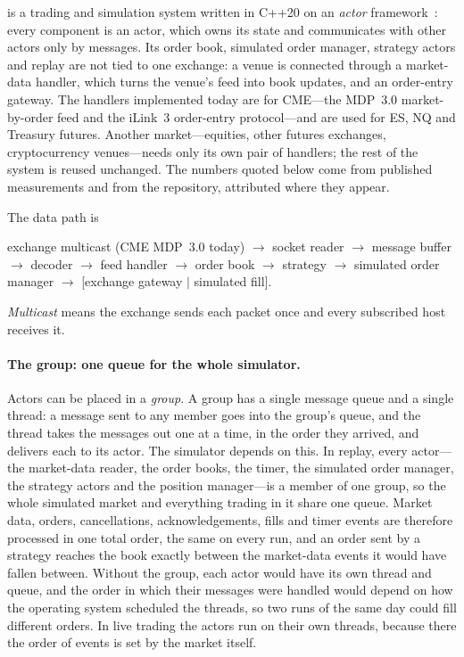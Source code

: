 \kasparhft{} is a trading and simulation system written in C++20 on an \emph{actor} framework~\citep{maciejewski_actor}:
every component is an actor, which owns its state and communicates with other actors only by messages. Its order
book, simulated order manager, strategy actors and replay are not tied to one exchange: a venue is connected through
a market-data handler, which turns the venue's feed into book updates, and an order-entry gateway. The handlers
implemented today are for CME---the MDP~3.0 market-by-order feed and the iLink~3 order-entry protocol---and are used
for ES, NQ and Treasury futures. Another market---equities, other futures exchanges, cryptocurrency venues---needs
only its own pair of handlers; the rest of the system is reused unchanged. The numbers quoted below come from
published measurements and from the \kasparhft{} repository, attributed where they appear.

The data path is
\begin{center}\small
exchange multicast (CME MDP~3.0 today) $\to$ socket reader $\to$ message buffer $\to$ decoder $\to$ feed handler
$\to$ order book $\to$ strategy $\to$ simulated order manager $\to$ [exchange gateway $\mid$ simulated fill].
\end{center}
\emph{Multicast} means the exchange sends each packet once and every subscribed host receives it. 

\paragraph{The group: one queue for the whole simulator.}\label{sec:kaspar-group} Actors can be placed in a \emph{group}. A group has a single
message queue and a single thread: a message sent to any member goes into the group's queue, and the thread takes the
messages out one at a time, in the order they arrived, and delivers each to its actor. The simulator depends on this.
In replay, every actor---the market-data reader, the order books, the timer, the simulated order manager, the
strategy actors and the position manager---is a member of one group, so the whole simulated market and everything
trading in it share one queue. Market data, orders, cancellations, acknowledgements, fills and timer events are
therefore processed in one total order, the same on every run, and an order sent by a strategy reaches the book
exactly between the market-data events it would have fallen between. Without the group, each actor would have its own
thread and queue, and the order in which their messages were handled would depend on how the operating system
scheduled the threads, so two runs of the same day could fill different orders. In live trading the actors run on
their own threads, because there the order of events is set by the market itself.

